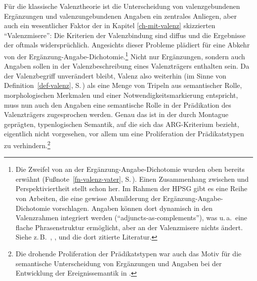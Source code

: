 Für die klassische Valenztheorie ist die Unterscheidung von valenzgebundenen Ergänzungen und valenzungebundenen Angaben ein zentrales Anliegen, aber auch ein wesentlicher Faktor der in Kapitel \ref{ch-mit-valenz} skizzierten "`Valenzmisere"': Die Kriterien der Valenzbindung sind diffus und die Ergebnisse der  oftmals widersprüchlich. Angesichts dieser Probleme plädiert \cite{Storrer:92} für eine Abkehr von der Ergänzung-Angabe-Dichotomie.\footnote{Die Zweifel von \cite{Vater:78} an der Ergänzung-Angabe-Dichotomie wurden oben bereits erwähnt (Fußnote~\ref{fn-valenz-vater}, S.\,\pageref{fn-valenz-vater}). Einen Zusammenhang zwischen  und Perspektiviertheit stellt schon \cite{Heringer:84} her. Im Rahmen der HPSG gibt es eine Reihe von Arbeiten, die eine gewisse Abmilderung der Ergänzung-Angabe-Dichotomie vorschlagen. Angaben können dort dynamisch in den Valenzrahmen integriert werden ("`adjuncts-as-complements"'), was u.\,a.\ eine flache Phrasenstruktur ermöglicht, aber an der Valenzmisere nichts ändert. Siehe z.\,B.\ \citet[Kapitel~9]{Przepiorkowski:99}, \cite{Bouma:etal:01}, \cite{Bouma:03} und die dort zitierte Literatur.} Nicht nur Ergänzungen, sondern auch Angaben sollen in der Valenzbeschreibung eines Valenzträgers enthalten sein. Da der Valenzbegriff unverändert bleibt, Valenz also weiterhin (im Sinne von Definition~\ref{def-valenz}, S.\,\pageref{def-valenz}) als eine Menge von Tripeln aus semantischer Rolle, morphologischen Merkmalen und einer Notwendigkeitsmarkierung entspricht, muss nun auch den Angaben eine semantische Rolle in der Prädikation des Valenzträgers zugesprochen werden. Genau das ist in der durch Montague geprägten, typenlogischen Semantik, auf die sich das ARG-Kriterium bezieht, eigentlich nicht vorgesehen, vor allem um eine Proliferation der Prädikatstypen zu verhindern.\footnote{Die drohende Proliferation der Prädikatstypen war auch das Motiv für die semantische Unterscheidung von Ergänzungen und Angaben bei der Entwicklung der Ereignissemantik in \cite{Davidson:67}.} 

